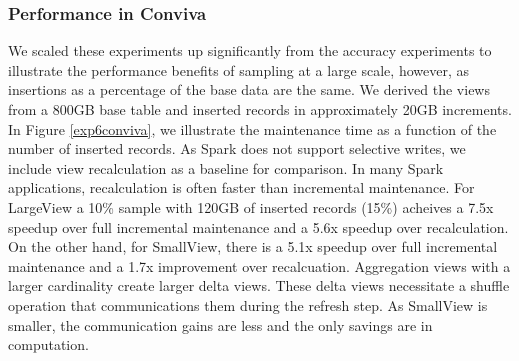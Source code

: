 \subsubsection{Performance in Conviva}
We scaled these experiments up significantly from the accuracy experiments to illustrate the performance benefits of sampling at a large scale, however, as insertions as a percentage of the base data are the same.
We derived the views from a 800GB base table and inserted records in approximately 20GB increments. 
In Figure \ref{exp6conviva}, we illustrate the maintenance time as a function of the number of inserted records.
As Spark does not support selective writes, we include view recalculation as a baseline for comparison.
In many Spark applications, recalculation is often faster than incremental maintenance.
For LargeView a 10\% sample with 120GB of inserted records (15\%) acheives a  7.5x speedup over full incremental maintenance and a 5.6x speedup over recalculation.
On the other hand, for SmallView, there is a 5.1x speedup over full incremental maintenance and a 1.7x improvement over recalcuation.
Aggregation views with a larger cardinality create larger delta views.
These delta views necessitate a shuffle operation that communications them during the refresh step.
As SmallView is smaller, the communication gains are less and the only savings are in computation.



